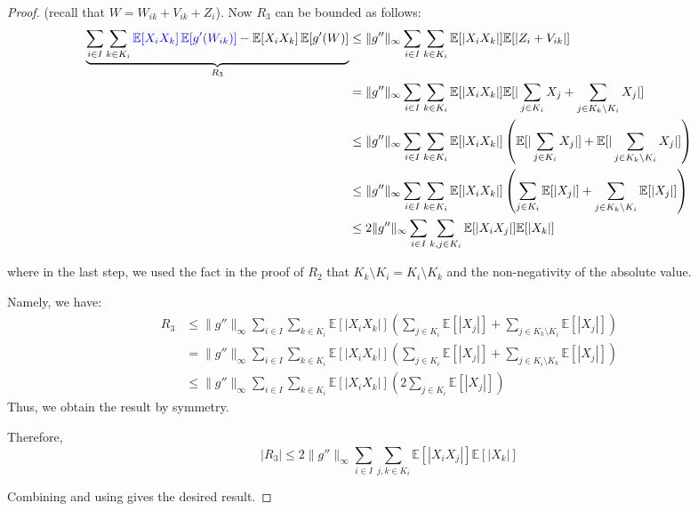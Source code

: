 \documentclass{article}
\begin{document}
\begin{proof}
(recall that $W = W_{ik} + V_{ik} + Z_i$). Now $R_3$ can be bounded as follows:
\begin{align*}
    \underbrace{\sum_{i\in I}\sum_{k\in K_{i}}\textcolor{blue}{\mathbb{E}[X_{i}X_{k}]\operatorname{\mathbb{E}}[g^{\prime}(W_{i k})]}-\mathbb{E}[X_{i}X_{k}]\operatorname{\mathbb{E}}[g^{\prime}(W)]}_{R_3} &\leq \|g''\|_\infty \sum_{i\in I}\sum_{k\in K_{i}}\mathbb{E}[|X_{i}X_{k}|]\mathbb{E}[|Z_i+V_{ik}|]\\
    &=\|g''\|_\infty \sum_{i\in I}\sum_{k\in K_{i}}\mathbb{E}[|X_{i}X_{k}|]\mathbb{E}[|\sum_{j\in K_i} X_j + \sum_{j\in K_k\setminus K_i} X_j|]\\
    &\leq \|g''\|_\infty \sum_{i\in I}\sum_{k\in K_{i}}\mathbb{E}[|X_{i}X_{k}|]\left(\mathbb{E}[|\sum_{j\in K_i} X_j|] + \mathbb{E}[|\sum_{j\in K_k\setminus K_i} X_j|]\right)\\
    &\leq \|g''\|_\infty \sum_{i\in I}\sum_{k\in K_{i}}\mathbb{E}[|X_{i}X_{k}|]\left(\sum_{j\in K_i} \mathbb{E}[| X_j|] + \sum_{j\in K_k\setminus K_i} \mathbb{E}[|X_j|]\right)\\
    &\leq 2 \|g''\|_\infty \sum_{i\in I}\sum_{k,j\in K_{i}}\mathbb{E}[|X_{i}X_{j}|]\mathbb{E}[|X_k|]\\
\end{align*}

where in the last step, we used the fact in the proof of $R_2$ that $K_k\setminus K_i = K_i\setminus K_k$ and the non-negativity of the absolute value.

\begin{unexaminable}
    Namely, we have:
    \begin{align*}
        R_3&\leq \|g''\|_\infty \sum_{i\in I}\sum_{k\in K_{i}}\mathbb{E}[|X_{i}X_{k}|]\left(\sum_{j\in K_i} \mathbb{E}[| X_j|] + \sum_{j\in K_k\setminus K_i} \mathbb{E}[|X_j|]\right) \\
        &= \|g''\|_\infty \sum_{i\in I}\sum_{k\in K_{i}}\mathbb{E}[|X_{i}X_{k}|]\left(\sum_{j\in K_i} \mathbb{E}[| X_j|] + \sum_{j\in K_i\setminus K_k} \mathbb{E}[|X_j|]\right)\\
        &\leq \|g''\|_\infty \sum_{i\in I}\sum_{k\in K_{i}}\mathbb{E}[|X_{i}X_{k}|]\left(2\sum_{j\in K_i} \mathbb{E}[| X_j|] \right)
    \end{align*}
    Thus, we obtain the result by symmetry.
\end{unexaminable}

Therefore, 
\begin{equation}\label{eq:R3_bound}
    |R_3| \leq 2\|g''\|_\infty \sum_{i\in I}\sum_{j,k\in K_{i}}\mathbb{E}[|X_{i}X_{j}|]\mathbb{E}[|X_k|]
\end{equation}

Combining  and using  gives the desired result.  

\end{proof}
\end{document}
